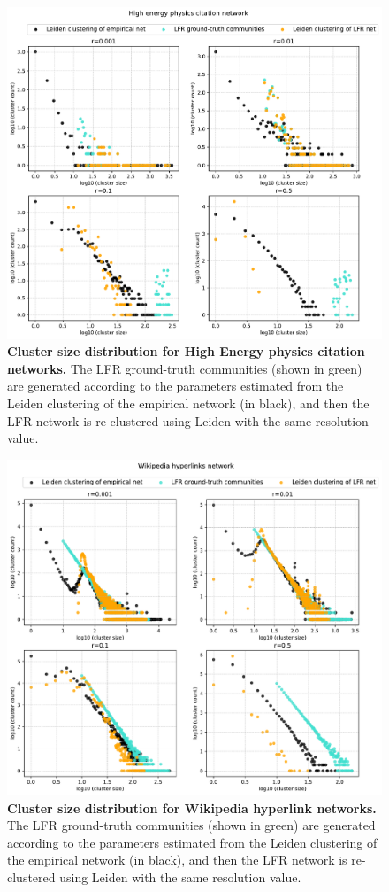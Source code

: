 \documentclass[a4paper]{article}   	%
\begin{document}
\begin{figure}[H]
\centering
\includegraphics[width=0.85\linewidth]{figs/cit_hepph_cm_size.pdf}
\caption[Cluster size distribution for High Energy physics citation networks.]{\textbf{Cluster size distribution for High Energy physics citation networks.} The LFR ground-truth communities (shown in green) are generated according to the parameters estimated from the Leiden clustering of the empirical network (in black), and then the LFR network is re-clustered using Leiden with the same resolution value. }
\end{figure}


\begin{figure}[H]
\centering
\includegraphics[width=0.85\linewidth]{figs/wiki_topcats_cm_size.pdf}
\caption[Cluster size distribution for Wikipedia hyperlink networks.]{\textbf{Cluster size distribution for Wikipedia hyperlink networks.} The LFR ground-truth communities (shown in green) are generated according to the parameters estimated from the Leiden clustering of the empirical network (in black), and then the LFR network is re-clustered using Leiden with the same resolution value. }
\end{figure}
\end{document}
